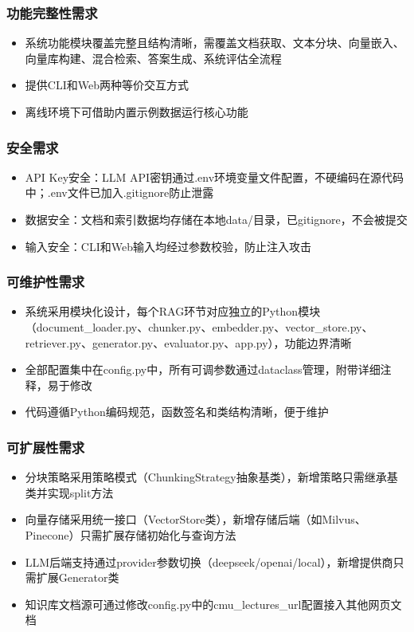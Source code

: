 \documentclass[10pt,a4paper]{article}
\begin{document}
\subsubsection{功能完整性需求}
\begin{itemize}
\item 系统功能模块覆盖完整且结构清晰，需覆盖文档获取、文本分块、向量嵌入、向量库构建、混合检索、答案生成、系统评估全流程
\item 提供CLI和Web两种等价交互方式
\item 离线环境下可借助内置示例数据运行核心功能
\end{itemize}

\subsubsection{安全需求}
\begin{itemize}
\item API Key安全：LLM API密钥通过.env环境变量文件配置，不硬编码在源代码中；.env文件已加入.gitignore防止泄露
\item 数据安全：文档和索引数据均存储在本地data/目录，已gitignore，不会被提交
\item 输入安全：CLI和Web输入均经过参数校验，防止注入攻击
\end{itemize}

\subsubsection{可维护性需求}
\begin{itemize}
\item 系统采用模块化设计，每个RAG环节对应独立的Python模块（document\_loader.py、chunker.py、embedder.py、vector\_store.py、retriever.py、generator.py、evaluator.py、app.py），功能边界清晰
\item 全部配置集中在config.py中，所有可调参数通过dataclass管理，附带详细注释，易于修改
\item 代码遵循Python编码规范，函数签名和类结构清晰，便于维护
\end{itemize}

\subsubsection{可扩展性需求}
\begin{itemize}
\item 分块策略采用策略模式（ChunkingStrategy抽象基类），新增策略只需继承基类并实现split方法
\item 向量存储采用统一接口（VectorStore类），新增存储后端（如Milvus、Pinecone）只需扩展存储初始化与查询方法
\item LLM后端支持通过provider参数切换（deepseek/openai/local），新增提供商只需扩展Generator类
\item 知识库文档源可通过修改config.py中的cmu\_lectures\_url配置接入其他网页文档
\end{itemize}
\end{document}
